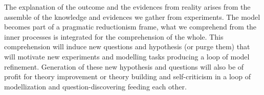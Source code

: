 \documentclass[11pt,oneside,a4paper,openright]{report}
\begin{document}
%
%
%
The explanation of the outcome and the evidences from reality arises from the assemble of the knowledge and evidences we gather from experiments. The model becomes part of a pragmatic reductionism frame, what we comprehend from the inner processes is integrated for the comprehension of the whole. This comprehension will induce new questions and hypothesis (or purge them) that will motivate new experiments and modelling tasks producing a loop of model refinement. Generation of these new hypothesis and questions will also be of profit for theory improvement or theory building and self-criticism in a loop of modellization and question-discovering feeding each other. 

\end{document}
